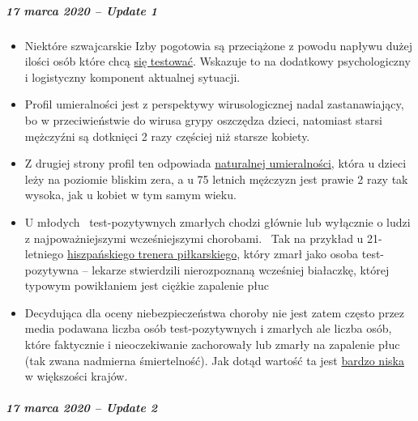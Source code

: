 \hypertarget{17-marca-2020--update-1}{%
\subparagraph{\texorpdfstring{\textbf{17 marca 2020 -- Update
1}}{17 marca 2020 -- Update 1}}\label{17-marca-2020--update-1}}

\begin{itemize}
\tightlist
\item
  Niektóre szwajcarskie Izby pogotowia są przeciążone z powodu napływu
  dużej ilości osób które chcą
  \href{https://insideparadeplatz.ch/2020/03/16/notfall-stationen-bereits-seit-tagen-am-anschlag/}{się
  testować}. Wskazuje to na dodatkowy psychologiczny i logistyczny
  komponent aktualnej sytuacji.
\item
  Profil umieralności jest z perspektywy wirusologicznej nadal
  zastanawiający, bo w przeciwieństwie do wirusa grypy oszczędza dzieci,
  natomiast starsi mężczyźni są dotknięci 2 razy częściej niż starsze
  kobiety.
\item
  Z drugiej strony profil ten odpowiada
  \href{http://www.gbe-bund.de/gbe10/abrechnung.prc_abr_test_logon?p_uid=gast\&p_aid=0\&p_knoten=FID\&p_sprache=D\&p_suchstring=820}{naturalnej
  umieralności}, która u dzieci leży na poziomie bliskim zera, a u 75
  letnich mężczyzn jest prawie 2 razy tak wysoka, jak u kobiet w tym
  samym wieku.
\item
  U młodych~ test-pozytywnych zmarłych chodzi głównie lub wyłącznie o
  ludzi z najpoważniejszymi wcześniejszymi chorobami.~ Tak na przykład u
  21-letniego
  \href{https://www.msn.com/de-ch/news/other/spanischer-nachwuchs-trainer-stirbt-an-corona/ar-BB11gT64}{hiszpańskiego
  trenera piłkarskiego}, który zmarł jako osoba test-pozytywna --
  lekarze stwierdzili nierozpoznaną wcześniej białaczkę, której~ typowym
  powikłaniem jest ciężkie zapalenie płuc
\item
  Decydująca dla oceny niebezpieczeństwa choroby nie jest zatem często
  przez media podawana liczba osób test-pozytywnych i zmarłych ale
  liczba osób, które faktycznie i nieoczekiwanie zachorowały lub zmarły
  na zapalenie płuc (tak zwana nadmierna śmiertelność). Jak dotąd
  wartość ta jest \href{https://www.euromomo.eu/index.html}{bardzo
  niska} w większości krajów.
\end{itemize}

\hypertarget{17-marca-2020--update-2}{%
\subparagraph{\texorpdfstring{\textbf{17 marca 2020 -- Update
2}}{17 marca 2020 -- Update 2}}\label{17-marca-2020--update-2}}

